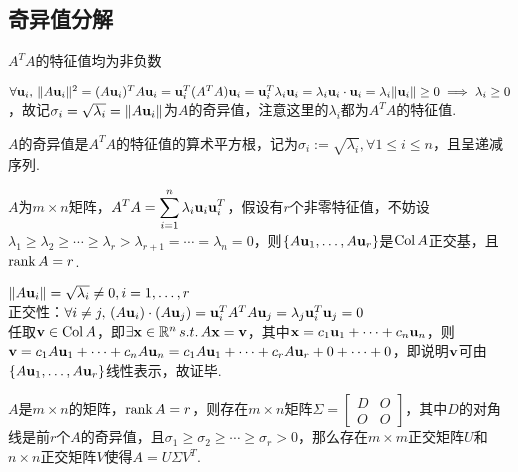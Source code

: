 \subsection{奇异值分解}%
\begin{theorem}
$A^TA$的特征值均为非负数
\end{theorem}
\begin{analysis}
$\forall\mathbf{u}_i,\,\|A\mathbf{u}_i\|^2=(A\mathbf{u}_i)^TA\mathbf{u}_i=\mathbf{u}_i^T(A^TA)\mathbf{u}_i=\mathbf{u}_i^T\lambda_i\mathbf{u}_i=\lambda_i\mathbf{u}_i\cdot\mathbf{u}_i=\lambda_i\|\mathbf{u}_i\|\geq 0\implies \lambda_i\geq 0$，故记$\sigma_i=\sqrt{\lambda_i}=\|A\mathbf{u}_i\|$为$A$的奇异值，注意这里的$\lambda_i$都为$A^TA$的特征值.
\end{analysis}
\begin{definition}[奇异值]
$A$的奇异值是$A^TA$的特征值的算术平方根，记为$\sigma_i:=\sqrt{\lambda_i},\forall 1\leq i\leq n$，且呈递减序列.
\end{definition}
\begin{theorem}
$A$为$m\times n$矩阵，$\displaystyle A^TA=\sum_{i=1}^n\lambda_i\mathbf{u}_i\mathbf{u}_i^T$，假设有$r$个非零特征值，不妨设$\lambda_1\geq\lambda_2\geq\cdots\geq\lambda_r>\lambda_{r+1}=\cdots=\lambda_n=0$，则$\{A\mathbf{u}_1,\dots,A\mathbf{u}_r\}$是$\mathrm{Col}\, A$正交基，且$\mathrm{rank}\, A=r$.
\end{theorem}
\begin{analysis}
$\|A\mathbf{u}_i\|=\sqrt{\lambda_i}\ne 0,i=1,\dots,r$\\
正交性：$\forall i\ne j,\,(A\mathbf{u}_i)\cdot(A\mathbf{u}_j)=\mathbf{u}_i^TA^TA\mathbf{u}_j=\lambda_j\mathbf{u}_i^T\mathbf{u}_j=0$\\
任取$\mathbf{v}\in\mathrm{Col}\, A$，即$\exists\mathbf{x}\in\mathbb{R}^n\,s.t.\,A\mathbf{x}=\mathbf{v}$，其中$\mathbf{x}=c_1\mathbf{u}_1+\cdots+c_n\mathbf{u}_n$，则$\mathbf{v}=c_1A\mathbf{u}_1+\cdots+c_nA\mathbf{u}_n=c_1A\mathbf{u}_1+\cdots+c_rA\mathbf{u}_r+0+\cdots+0$，即说明$\mathbf{v}$可由$\{A\mathbf{u}_1,\dots,A\mathbf{u}_r\}$线性表示，故证毕.
\end{analysis}
\begin{theorem}
$A$是$m\times n$的矩阵，$\mathrm{rank}\, A=r$，则存在$m\times n$矩阵$\Sigma=\begin{bmatrix}D&O\\O&O\end{bmatrix}$，其中$D$的对角线是前$r$个$A$的奇异值，且$\sigma_1\geq\sigma_2\geq\cdots\geq\sigma_r>0$，那么存在$m\times m$正交矩阵$U$和$n\times n$正交矩阵$V$使得$A=U\Sigma V^T$.
\end{theorem}
